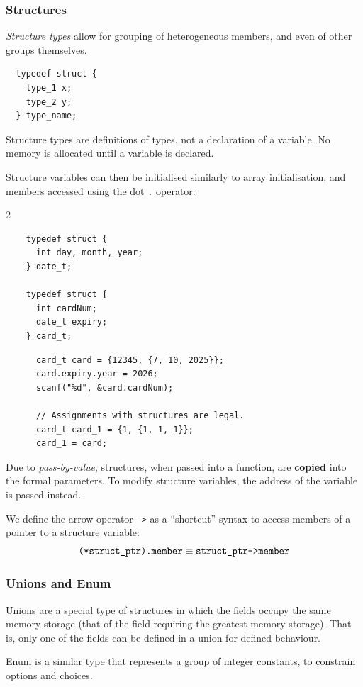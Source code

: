 \subsubsection{Structures}
\textit{Structure types} allow for grouping of heterogeneous members, and even
of other groups themselves.
\begin{lstlisting}
  typedef struct {
    type_1 x;
    type_2 y;
  } type_name;
\end{lstlisting}
\begin{remark}
  Structure types are definitions of types, not a declaration of a variable. No
  memory is allocated until a variable is declared.
\end{remark}
\begin{example}
  Structure variables can then be initialised similarly to array
  initialisation, and members accessed using the dot \verb|.| operator:
  \begin{multicols}{2}
    \begin{lstlisting}
    typedef struct {
      int day, month, year;
    } date_t;

    typedef struct {
      int cardNum;
      date_t expiry;
    } card_t;
    \end{lstlisting}
    \begin{lstlisting}
      card_t card = {12345, {7, 10, 2025}};
      card.expiry.year = 2026;
      scanf("%d", &card.cardNum);

      // Assignments with structures are legal.
      card_t card_1 = {1, {1, 1, 1}};
      card_1 = card;
    \end{lstlisting}
    \vfill\null
  \end{multicols}
\end{example}
\begin{remark}
  Due to \textit{pass-by-value}, structures, when passed into a function, are
  \textbf{copied} into the formal parameters.
  To modify structure variables, the address of the variable is passed instead.
\end{remark}
We define the arrow operator \verb|->| as a ``shortcut'' syntax to access
members of a pointer to a structure variable:
\[\verb|(*struct_ptr).member|\equiv\verb|struct_ptr->member|\] 

\subsubsection{Unions and Enum}
Unions are a special type of structures in which the fields occupy the same
memory storage (that of the field requiring the greatest memory storage). That
is, only one of the fields can be defined in a union for defined behaviour.

Enum is a similar type that represents a group of integer constants, to
constrain options and choices.
